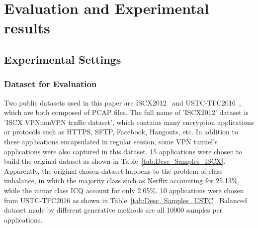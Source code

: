 \documentclass[conference]{IEEEtran}
\begin{document}

\section{Evaluation and Experimental results}\label{exp:results}
\subsection {Experimental Settings}\label{exp:setting}
\subsubsection{Dataset for Evaluation}\label{exp:dataset}
Two public datasets used in this paper are ISCX2012~\cite{ISCX} and USTC-TFC2016~\cite{Wang2D-CNN}, which are both composed of PCAP files. The full name of 'ISCX2012' dataset is 'ISCX VPN\-nonVPN traffic dataset', which contains many encryption applications or protocols such as HTTPS, SFTP, Facebook, Hangouts, etc. In addition to these applications encapsulated in regular session, some VPN tunnel's applications were also captured in this dataset. 15 applications were chosen to build the original dataset as shown in Table~\ref{tab:Desc_Samples_ISCX}. Apparently, the original chosen dataset happens to the problem of class imbalance, in which the majority class such as Netflix accounting for 25.13\%, while the minor class ICQ account for only 2.05\%. 10 applications were chosen from USTC-TFC2016 as shown in Table~\ref{tab:Desc_Samples_USTC}. Balanced dataset made by different generative methods are all 10000 samples per applications.
\end{document}
